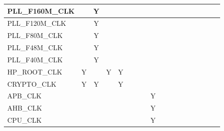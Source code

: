 \documentclass[main\_\_CN.tex]{subfiles}
\begin{document}
\begin{landscape}
\begin{tiny}
\begin{longtable}[c]{|m{1.7cm}|c|c|c|c|c|c|c|C{1.5cm}|c|c|c|c|c|c|c|c|c| }
    PLL\_F160M\_CLK &   & Y &  &   &   &   &   &  &   &   &   &   &   &   &   &   &   \\ \hline
    PLL\_F120M\_CLK &   & Y &  &   &   &   &   &  &   &   &   &   &   &   &   &   &    \\ \hline
    PLL\_F80M\_CLK &   & Y &  &   &   &   &   &  &   &   &   &   &   &   &   &   &    \\ \hline
    PLL\_F48M\_CLK &   & Y &   &   &   &   &   &  &   &   &   &   &   &   &   &   &   \\ \hline
    PLL\_F40M\_CLK &   & Y &  &   &   &   &   &  &   &   &   &   &   &   &   &   &    \\ \hline
    HP\_ROOT\_CLK & Y &  & Y & Y &   &   &   &  &   &   &   &   &   &   &   &   &    \\ \hline
    CRYPTO\_CLK & Y & Y &  & Y &   &   &   &  &   &   &   &   &   &   &   &   &    \\ \hline
    APB\_CLK &   &   &   &   &   &   &   &   Y &   &   &   &   &   &   &   &  &  \\ \hline
    AHB\_CLK &   &   &   &   &   &   &   &   Y &   &   &   &   &   &   &   &  &  \\ \hline
    CPU\_CLK &   &   &   &   &   &   &   &   Y &   &   &   &   &   &   &   &  &  \\ \hline
\end{longtable}
\newpage


\end{tiny}
\end{landscape}
\end{document}
